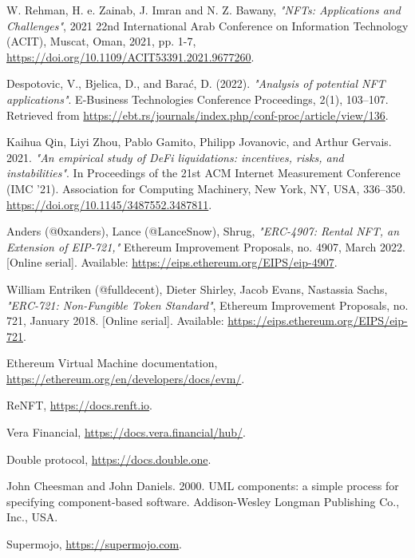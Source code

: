 \documentclass[english, LaM, oneside]{sapthesis}%
\begin{document}
\backmatter
{}
\begin{thebibliography}{17}

W. Rehman, H. e. Zainab, J. Imran and N. Z. Bawany, \textit{"NFTs: Applications and Challenges"}, 2021 22nd International Arab Conference on Information Technology (ACIT), Muscat, Oman, 2021, pp. 1-7, \url{https://doi.org/10.1109/ACIT53391.2021.9677260}.

Despotovic, V., Bjelica, D., and Barać, D. (2022). \textit{"Analysis of potential NFT applications"}. E-Business Technologies Conference Proceedings, 2(1), 103–107. Retrieved from \url{https://ebt.rs/journals/index.php/conf-proc/article/view/136}.

Kaihua Qin, Liyi Zhou, Pablo Gamito, Philipp Jovanovic, and Arthur Gervais. 2021. \textit{"An empirical study of DeFi liquidations: incentives, risks, and instabilities"}. In Proceedings of the 21st ACM Internet Measurement Conference (IMC '21). Association for Computing Machinery, New York, NY, USA, 336–350. \url{https://doi.org/10.1145/3487552.3487811}.

Anders (@0xanders), Lance (@LanceSnow), Shrug, \textit{"ERC-4907: Rental NFT, an Extension of EIP-721,"} Ethereum Improvement Proposals, no. 4907, March 2022. [Online serial]. Available: \url{https://eips.ethereum.org/EIPS/eip-4907}.

William Entriken (@fulldecent), Dieter Shirley, Jacob Evans, Nastassia Sachs, \textit{"ERC-721: Non-Fungible Token Standard"}, Ethereum Improvement Proposals, no. 721, January 2018. [Online serial]. Available: \url{https://eips.ethereum.org/EIPS/eip-721}.

Ethereum Virtual Machine documentation, \url{https://ethereum.org/en/developers/docs/evm/}.

ReNFT, \url{https://docs.renft.io}.

Vera Financial, \url{https://docs.vera.financial/hub/}.

Double protocol, \url{https://docs.double.one}.

John Cheesman and John Daniels. 2000. UML components: a simple process for specifying component-based software. Addison-Wesley Longman Publishing Co., Inc., USA.

Supermojo, \url{https://supermojo.com}.


\end{thebibliography}
\end{document}

